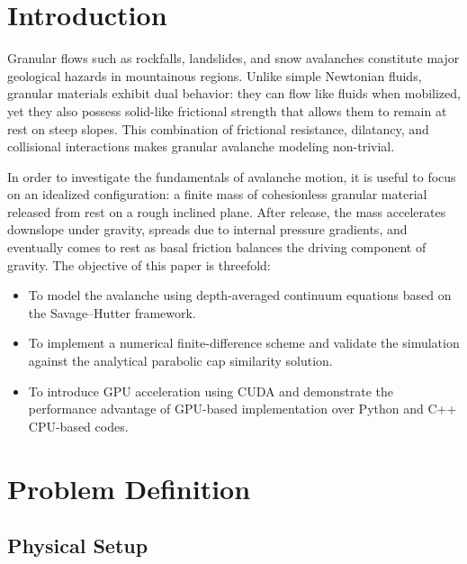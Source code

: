 \documentclass[10pt, conference]{FMFP2023}
\begin{document}
\section{Introduction}

Granular flows such as rockfalls, landslides, and snow avalanches
constitute major geological hazards in mountainous regions.
Unlike simple Newtonian fluids, granular materials exhibit dual
behavior: they can flow like fluids when mobilized, yet they also
possess solid-like frictional strength that allows them to remain at
rest on steep slopes.
This combination of frictional resistance, dilatancy, and collisional
interactions makes granular avalanche modeling non-trivial.

In order to investigate the fundamentals of avalanche motion, it is
useful to focus on an idealized configuration: a finite mass of
cohesionless granular material released from rest on a rough inclined
plane.
After release, the mass accelerates downslope under gravity, spreads
due to internal pressure gradients, and eventually comes to rest as
basal friction balances the driving component of gravity.
The objective of this paper is threefold:
\begin{itemize}[nosep]
    \item To model the avalanche using depth-averaged continuum
          equations based on the Savage--Hutter framework.
    \item To implement a numerical finite-difference scheme and
          validate the simulation against the analytical parabolic cap
          similarity solution.
    \item To introduce GPU acceleration using CUDA and demonstrate the
          performance advantage of GPU-based implementation over Python
          and C++ CPU-based codes.
\end{itemize}


\section{Problem Definition}

\subsection{Physical Setup}
\end{document}
